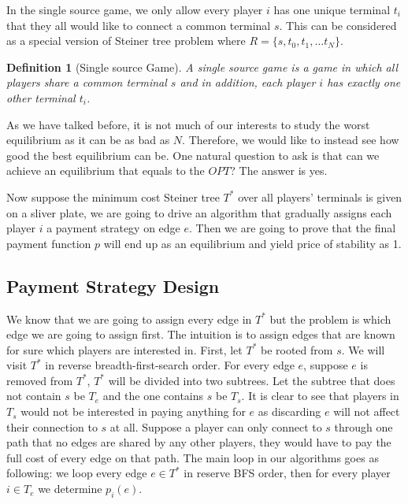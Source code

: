 \documentclass[11pt,psfig,times]{article}
\newtheorem{definition}{Definition}[section]
\newtheorem{fact}{Fact}
\begin{document}
In the single source game, we only allow every player \(i\) has one unique terminal \(t_i\)that they all would like to connect a common terminal \(s\). This can be considered as a special version of Steiner tree problem where \(R = \{s,t_0,t_1,...t_N\}\). 

\begin{definition}[Single source Game]
	A single source game is a game in which all players share a common terminal \(s\) and in addition, each player \(i\) has exactly one other terminal \(t_i\).
\end{definition}

As we have talked before, it is not much of our interests to study the worst equilibrium as it can be as bad as $N$. Therefore, we would like to instead see how good the best equilibrium can be. One natural question to ask is that can we achieve an equilibrium that equals to the \(OPT\)? The answer is yes.

Now suppose the minimum cost Steiner tree \(T^*\) over all players' terminals is given on a sliver plate, we are going to drive an algorithm that gradually assigns each player \(i\) a payment strategy on edge \(e\). Then we are going to prove that the final payment function \(p\) will end up as an equilibrium and yield price of stability as 1.  


\subsection{Payment Strategy Design}
We know that we are going to assign every edge in \(T^*\) but the problem is which edge we are going to assign first. The intuition is to assign edges that are known for sure which players are interested in. First, let \(T^*\) be rooted from \(s\). We will visit \(T^*\) in reverse breadth-first-search order. For every edge \(e\), suppose \(e\) is removed from \(T^*\), \(T^*\) will be divided into two subtrees. Let the subtree that does not contain \(s\) be \(T_e\) and the one contains \(s\) be \(T_s\). It is clear to see that players in \(T_s\) would not be interested in paying anything for \(e\) as discarding \(e\) will not affect their connection to \(s\) at all. Suppose a player can only connect to \(s\) through one path that no edges are shared by any other players, they would have to pay the full cost of every edge on that path. The main loop in our algorithms goes as following: we loop every edge \(e \in T^*\) in reserve BFS order, then for every player \(i \in T_e\) we determine \(p_i(e)\).
\end{document}
